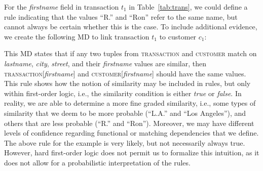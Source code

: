 For the \textsl{firstname} field in transaction $t_1$ in Table~\ref{tab:trans}, we could define a rule indicating that the values ``R.'' and ``Ron'' refer to the same name, but cannot always be certain whether this is the case. To include additional evidence, we create the following MD to link transaction $t_1$ to customer $c_1$:\\ 
\vspace*{-0.5cm}
\begin{table}[h]\footnotesize
\scriptsize
\centering
{}
\end{table}
\vspace*{-0.5cm}

This MD states that if any two tuples from \textsc{transaction} and \textsc{customer} match on \textsl{lastname}, \textsl{city}, \textsl{street}, and their \textsl{firstname} values are similar, then \textsc{transaction}[\textsl{firstname}] and \textsc{customer}[\textsl{firstname}] should have the same values. This rule shows how the notion of similarity may be included in rules, but only within first-order logic, i.e., the similarity condition is either \emph{true} or \emph{false}. In reality, we are able to determine a more fine graded similarity, i.e., some types of similarity that we deem to be more probable (``L.A.'' and ``Los Angeles''), and others that are less probable (``R.'' and ``Ron''). Moreover, we may have different levels of confidence regarding functional or matching dependencies that we define. The above rule for the example is very likely, but not necessarily always true. However, hard first-order logic does not permit us to formalize this intuition, as it does not allow for a probabilistic interpretation of the rules.